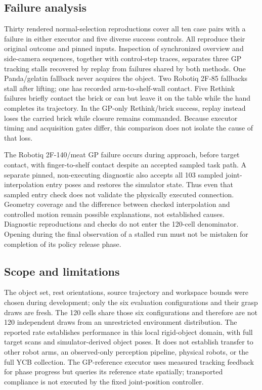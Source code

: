 \subsection{Failure analysis}
Thirty rendered normal-selection reproductions cover all ten case pairs with a
failure in either executor and five diverse success controls. All reproduce
their original outcome and pinned inputs. Inspection of synchronized overview
and side-camera sequences, together with control-step traces, separates three
GP tracking stalls recovered by replay from failures shared by both methods.
One Panda/gelatin fallback never acquires the object. Two Robotiq 2F-85
fallbacks stall after lifting; one has recorded arm-to-shelf-wall contact.
Five Rethink failures briefly contact the brick or can but leave it on the
table while the hand completes its trajectory. In the GP-only Rethink/brick
success, replay instead loses the carried brick while closure remains commanded.
Because executor timing and acquisition gates differ, this comparison does not
isolate the cause of that loss.

The Robotiq 2F-140/meat GP failure occurs during approach, before target contact,
with finger-to-shelf contact despite an accepted sampled task path. A separate
pinned, non-executing diagnostic also accepts all 103 sampled joint-interpolation
entry poses and restores the simulator state. Thus even that sampled entry check
does not validate the physically executed connection. Geometry coverage and the
difference between checked interpolation and controlled motion remain possible
explanations, not established causes. Diagnostic reproductions and checks do
not enter the 120-cell denominator. Opening during the final observation of a
stalled run must not be mistaken for completion of its policy release phase.

\subsection{Scope and limitations}
The object set, rest orientations, source trajectory and workspace bounds were
chosen during development; only the six evaluation configurations and their
grasp draws are fresh. The 120 cells share those six configurations and therefore
are not 120 independent draws from an unrestricted environment distribution.
The reported rate establishes performance in this local rigid-object domain,
with full target scans and simulator-derived object poses. It does not establish
transfer to other robot arms, an observed-only perception pipeline, physical
robots, or the full YCB collection. The GP-reference executor uses measured
tracking feedback for phase progress but queries its reference state spatially;
transported compliance is not executed by the fixed joint-position controller.
